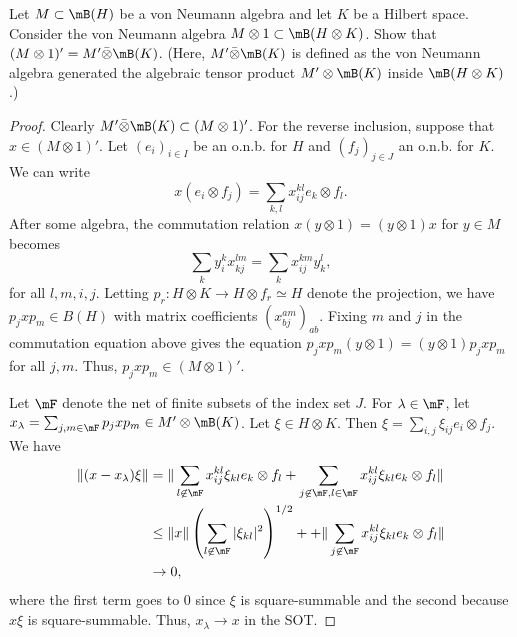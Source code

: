 \documentclass{article}
\begin{document}
 Let $M \subset \mB(H)$ be a von Neumann algebra and let $K$ be a Hilbert space. Consider the von
Neumann algebra $M \otimes 1 \subset \mB(H \otimes K)$. Show that $(M \otimes 1)' = M' \bar{\otimes} \mB(K)$.
(Here, $M' \bar{\otimes} \mB(K)$ is defined as the von Neumann algebra generated the algebraic
tensor product $M' \otimes \mB(K)$ inside $\mB(H \otimes K)$.)
\begin{proof}
  Clearly $M' \bar\otimes \mB(K) \subset (M \otimes 1)'$.  For the reverse inclusion, suppose that $x \in (M \otimes 1)'$.
  Let $(e_i)_{i \in I}$ be an o.n.b. for $H$ and $(f_j)_{j \in J}$ an o.n.b. for $K$.  We can write
  $$x (e_i \otimes f_j) = \sum_{k,l} x^{kl}_{ij} e_k \otimes f_l.$$
  After some algebra, the commutation relation $x (y \otimes 1) = (y \otimes 1) x$ for $y \in M$ becomes
  $$\sum_k y_i^k x^{lm}_{kj} = \sum_k x_{ij}^{km} y^l_k,$$
  for all $l,m,i,j$.   Letting $p_r: H \otimes K \to H \otimes f_r \simeq H$ denote the projection, we have
  $p_j x p_m \in B(H)$ with matrix coefficients $(x^{a m}_{b j})_{ab}$.  Fixing $m$ and $j$ in the commutation equation above
  gives the equation $p_j x p_m (y \otimes 1) = (y \otimes 1) p_j x p_m$ for all $j,m$.  Thus, $p_j x p_m \in (M \otimes 1)'$.

  Let $\mF$ denote the net of finite subsets of the index set $J$.  For $\lambda \in \mF$, let
  $x_\lambda = \sum_{j,m \in \mF} p_j x p_m \in M' \otimes \mB(K)$.  Let $\xi \in H \otimes K$.
  Then $\xi = \sum_{i,j} \xi_{ij} e_i \otimes f_j$.  We have
  \begin{align*}
    \|(x - x_\lambda) \xi \| & = \| \sum_{l \not\in \mF} x^{kl}_{ij} \xi_{kl} e_k \otimes f_l
    + \sum_{j \not \in \mF, l \in \mF} x^{kl}_{ij} \xi_{kl} e_k \otimes f_l  \| \\
    & \le \|x\|  \left( \sum_{l \not\in \mF} |\xi_{kl}|^2 \right)^{1/2} + + \| \sum_{j \not \in \mF} x^{kl}_{ij} \xi_{kl} e_k \otimes f_l  \| \\
    & \to 0,
  \end{align*}
  where the first term goes to 0 since $\xi$ is square-summable and the second because $x \xi$ is square-summable.
  Thus, $x_\lambda \to x$ in the SOT. 
\end{proof}
\end{document}
